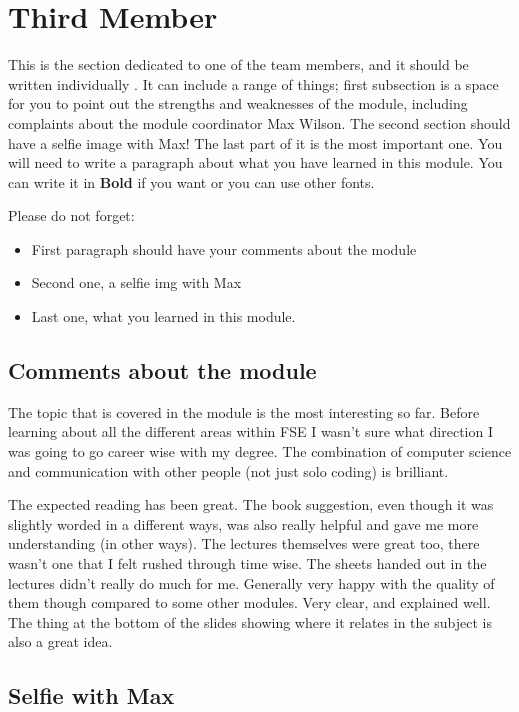 \section{Third Member}
This is the section dedicated to one of the team members, and it should be written individually . It can include a range of things; first subsection is a space for you to point out the strengths and weaknesses of the module, including complaints about the module coordinator Max Wilson. The second section should have a selfie image with Max! The last part of it is the most important one. You will need to write a paragraph about what you have learned in this module. You can write it in \textbf{Bold} if you want or you can use other fonts. 

Please do not forget:
\begin{itemize}
	\item First paragraph should have your comments about the module
	\item Second one, a selfie img with Max
	\item Last one, what you learned in this module.
\end{itemize}

\subsection{Comments about the module}
The topic that is covered in the module is the most interesting so far. Before learning about all the different areas within FSE I wasn't sure what direction I was going to go career wise with my degree. The combination of computer science and communication with other people (not just solo coding) is brilliant.

The expected reading has been great. The book suggestion, even though it was slightly worded in a different ways, was also really helpful and gave me more understanding (in other ways). The lectures themselves were great too, there wasn't one that I felt rushed through time wise. The sheets handed out in the lectures didn't really do much for me. Generally very happy with the quality of them though compared to some other modules. Very clear, and explained well. The thing at the bottom of the slides showing where it relates in the subject is also a great idea.

\subsection{Selfie with Max}


